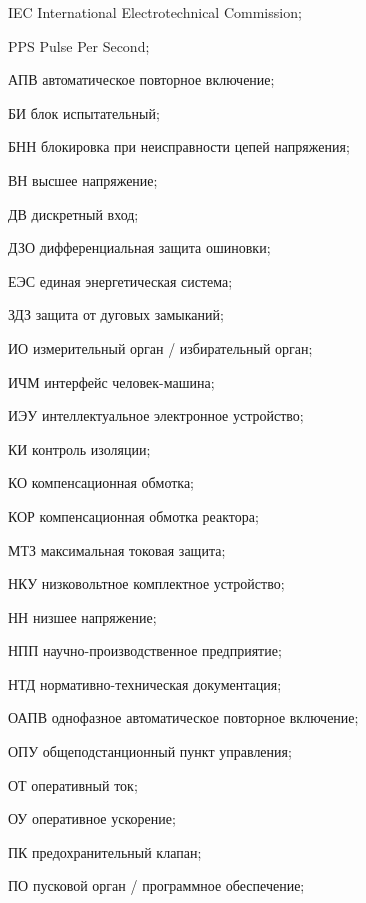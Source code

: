 \begin{list}{}%
{%
  \setlength{\labelwidth}{\abbrwidth}%
  \setlength{\labelsep}{0pt}%
  \setlength{\leftmargin}{\dimexpr\labelwidth+\labelsep\relax}%
  \setlength{\itemindent}{0pt}%
  \setlength{\parsep}{0pt}%
  \setlength{\itemsep}{0pt}
  \renewcommand{\makelabel}[1]{#1 --\hspace{\abbrgap}}%
}
\item[IEC]  International Electrotechnical Commission;
\item[PPS] Pulse Per Second;
\item[АПВ] автоматическое повторное включение;
\item[БИ] блок испытательный;
\item[БНН] блокировка при неисправности цепей напряжения;
\item[ВН] высшее напряжение;
\item[ДВ] дискретный вход;
\item[ДЗО] дифференциальная защита ошиновки;
\item[ЕЭС] единая энергетическая система;
\item[ЗДЗ] защита от дуговых замыканий;
\item[ИО] измерительный орган / избирательный орган;
\item[ИЧМ] интерфейс человек-машина;
\item[ИЭУ] интеллектуальное электронное устройство;
\item[КИ] контроль изоляции;
\item[КО] компенсационная обмотка;
\item[КОР] компенсационная обмотка реактора;
\item[МТЗ] максимальная токовая защита;
\item[НКУ] низковольтное комплектное устройство;
\item[НН] низшее напряжение;
\item[НПП] научно-производственное предприятие;
\item[НТД] нормативно-техническая документация;
\item[ОАПВ] однофазное автоматическое повторное включение;
\item[ОПУ] общеподстанционный пункт управления;
\item[ОТ] оперативный ток;
\item[ОУ] оперативное ускорение;
\item[ПК] предохранительный клапан;
\item[ПО] пусковой орган / программное обеспечение;

\end{list}
